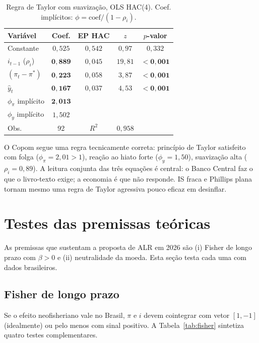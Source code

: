\documentclass[11pt,a4paper]{article}
\begin{document}
\begin{table}[H]
\centering
\small
\begin{tabular}{lcccc}
\toprule
Variável & Coef. & EP HAC & $z$ & $p$-valor \\
\midrule
Constante & $0{,}525$ & $0{,}542$ & $0{,}97$ & $0{,}332$ \\
$i_{t-1}$ ($\rho_i$) & $\mathbf{0{,}889}$ & $0{,}045$ & $19{,}81$ & $\mathbf{<0{,}001}$ \\
$(\pi_t - \pi^*)$ & $\mathbf{0{,}223}$ & $0{,}058$ & $3{,}87$ & $\mathbf{<0{,}001}$ \\
$\hat{y}_t$ & $\mathbf{0{,}167}$ & $0{,}037$ & $4{,}53$ & $\mathbf{<0{,}001}$ \\
\midrule
$\phi_\pi$ implícito & $\mathbf{2{,}013}$ & & & \\
$\phi_y$ implícito & $1{,}502$ & & & \\
Obs. & 92 & $R^2$ & $0{,}958$ & \\
\bottomrule
\end{tabular}
\caption{Regra de Taylor com suavização, OLS HAC(4). Coef. implícitos:
$\phi = \text{coef}/(1 - \rho_i)$.}
\label{tab:taylor}
\end{table}

O Copom segue uma regra tecnicamente correta: princípio de Taylor
satisfeito com folga ($\phi_\pi = 2{,}01 > 1$), reação ao hiato forte
($\phi_y = 1{,}50$), suavização alta ($\rho_i = 0{,}89$). A leitura
conjunta das três equações é central: o Banco Central faz o que
o livro-texto exige; a economia é que não responde. IS fraca e
Phillips plana tornam mesmo uma regra de Taylor agressiva pouco eficaz
em desinflar.

\section{Testes das premissas teóricas}\label{sec:premissas}

As premissas que sustentam a proposta de ALR em 2026 são (i) Fisher de
longo prazo com $\beta > 0$ e (ii) neutralidade da moeda. Esta seção
testa cada uma com dados brasileiros.

\subsection{Fisher de longo prazo}\label{sec:fisher}

Se o efeito neofisheriano vale no Brasil, $\pi$ e $i$ devem cointegrar
com vetor $[1, -1]$ (idealmente) ou pelo menos com sinal positivo. A
Tabela~\ref{tab:fisher} sintetiza quatro testes complementares.
\end{document}
